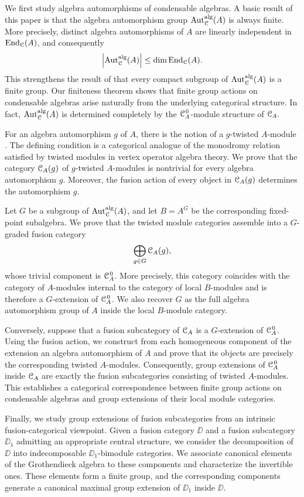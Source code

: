 \documentclass{amsart}
\begin{document}
We first study algebra automorphisms of condensable algebras. A basic result of this paper is that the algebra automorphism group
$
\operatorname{Aut}_{{\EuScript{C}}}^{\mathrm{alg}}(A)$
is always finite. More precisely, distinct algebra automorphisms of $A$ are linearly independent in $\operatorname{End}_{{\EuScript{C}}}(A)$, and consequently
$$
\left|\operatorname{Aut}_{{\EuScript{C}}}^{\mathrm{alg}}(A)\right|
\leq \dim \operatorname{End}_{{\EuScript{C}}}(A).
$$
This strengthens the result of \cite{Ki2002} that every  compact subgroup of $\operatorname{Aut}_{{\EuScript{C}}}^{\mathrm{alg}}(A)$ is a finite group. Our finiteness theorem shows that finite group actions on condensable algebras arise naturally from the underlying categorical structure. In fact, $\operatorname{Aut}_{{\EuScript{C}}}^{\mathrm{alg}}(A)$ is determined completely by the ${{\EuScript{C}}_A^{\hspace{1pt}0}}$-module structure of ${{\EuScript{C}}_A}.$

For an algebra automorphism $g$ of $A$, there is the notion of a $g$-twisted $A$-module \cite{Ki2002}. The defining condition is a categorical analogue of the monodromy relation satisfied by twisted modules in vertex operator algebra theory. We prove that the category ${{\EuScript{C}}_A}(g)$ of $g$-twisted $A$-modules is nontrivial for every algebra automorphism $g$. Moreover, the fusion action of every object in ${{\EuScript{C}}_A}(g)$ determines the automorphism $g$.

Let $G$ be a subgroup of $\operatorname{Aut}_{{\EuScript{C}}}^{\mathrm{alg}}(A)$, and let $B = A^G$ be the corresponding fixed-point subalgebra. We prove that the twisted module categories assemble into a $G$-graded fusion category
$$
\bigoplus_{g \in G} {{\EuScript{C}}_A}(g),
$$
whose trivial component is ${{\EuScript{C}}_A^{\hspace{1pt}0}}$. More precisely, this category coincides with the category of $A$-modules internal to the category of local $B$-modules and is therefore a $G$-extension of ${{\EuScript{C}}_A^{\hspace{1pt}0}}$. We also recover $G$ as the full algebra automorphism group of $A$ inside the local $B$-module category.

Conversely, suppose that a fusion subcategory of ${{\EuScript{C}}_A}$ is a $G$-extension of ${{\EuScript{C}}_A^{\hspace{1pt}0}}$. Using the fusion action, we construct from each homogeneous component of the extension an algebra automorphism of $A$ and prove that its objects are precisely the corresponding twisted $A$-modules. Consequently, group extensions of ${{\EuScript{C}}_A^{\hspace{1pt}0}}$ inside ${{\EuScript{C}}_A}$ are exactly the fusion subcategories consisting of twisted $A$-modules. This establishes a categorical correspondence between finite group actions on condensable algebras and group extensions of their local module categories. 

Finally, we study group extensions of fusion subcategories from an intrinsic fusion-categorical viewpoint. Given a fusion category $\DD$ and a fusion subcategory $\DD_1$ admitting an appropriate central structure, we consider the decomposition of $\DD$ into indecomposable $\DD_1$-bimodule categories. We associate canonical elements of the Grothendieck algebra to these components and characterize the invertible ones. These elements form a finite group, and the corresponding components generate a canonical maximal group extension of $\DD_1$ inside $\DD$.
\end{document}
